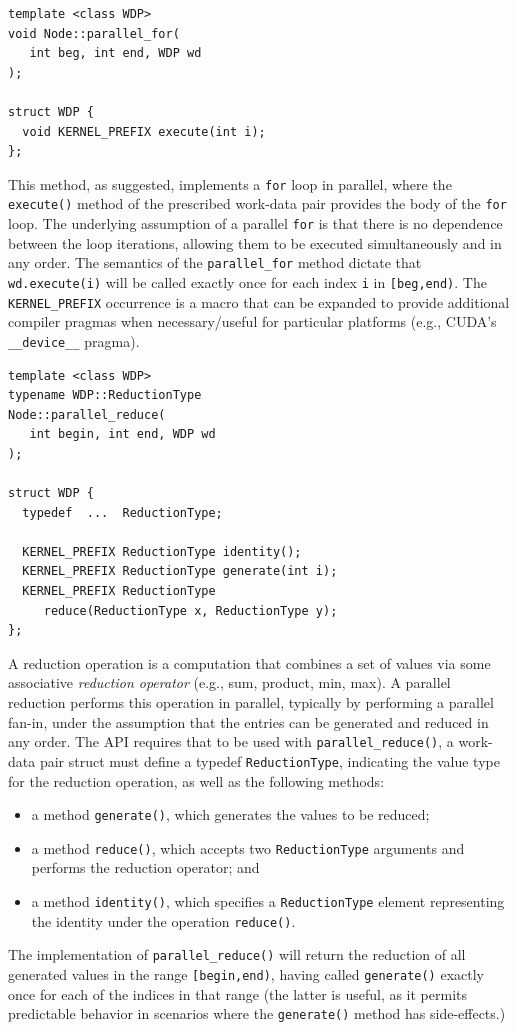 \documentclass[10pt,conference,letterpaper]{IEEEtran}
\begin{document}
{\small \begin{verbatim}
template <class WDP>
void Node::parallel_for(
   int beg, int end, WDP wd
); 

struct WDP {
  void KERNEL_PREFIX execute(int i);
};
\end{verbatim}}
This method, as suggested, implements a \verb!for! loop in parallel, where the \verb!execute()! method of the prescribed work-data pair provides the body of the \verb!for! loop. The underlying assumption of a parallel \verb!for!  is that there is no dependence between the loop iterations, allowing them to be executed simultaneously and in any order. The semantics of the \verb!parallel_for! method dictate that \verb!wd.execute(i)! will be called exactly once for each index \verb!i! in \verb![beg,end)!. The \verb!KERNEL_PREFIX! occurrence is a macro that can be expanded to provide additional compiler pragmas when necessary/useful for particular platforms (e.g., CUDA's \verb!__device__! pragma).

{\small \begin{verbatim}
template <class WDP>
typename WDP::ReductionType
Node::parallel_reduce(
   int begin, int end, WDP wd
); 

struct WDP {
  typedef  ...  ReductionType;

  KERNEL_PREFIX ReductionType identity();
  KERNEL_PREFIX ReductionType generate(int i);
  KERNEL_PREFIX ReductionType 
     reduce(ReductionType x, ReductionType y);
};
\end{verbatim}}
A reduction operation is a computation that combines a set of values via some associative \emph{reduction operator} (e.g., sum, product, min, max). A parallel reduction performs this operation in parallel, typically by performing a parallel fan-in, under the assumption that the entries can be generated and reduced in any order. The API requires that to be used with \verb!parallel_reduce()!, a work-data pair struct must define a typedef \verb!ReductionType!, indicating the value type for the reduction operation, as well as the following methods:
\begin{itemize}
\item a method \verb!generate()!, which generates the values to be reduced;
\item  a method \verb!reduce()!, which accepts two \verb!ReductionType! arguments and performs the reduction operator; and
\item a method \verb!identity()!, which specifies a \verb!ReductionType! element representing the identity under the operation \verb!reduce()!.
\end{itemize}The implementation of \verb!parallel_reduce()! will return the reduction of all generated values in the range \verb![begin,end)!, having called \verb!generate()! exactly once for each of the indices in that range (the latter is useful, as it permits predictable behavior in scenarios where the \verb!generate()! method has side-effects.)
\end{document}
